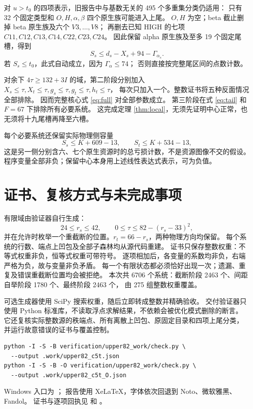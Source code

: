 \documentclass[11pt,a4paper]{article}
\begin{document}
对 $u>t_0$ 的四项表示，旧报告中与基数无关的 495 个多重集分类仍适用：
只有 32 个固定类型和 $O,H,\alpha,\beta$ 四个原生族可能进入上尾。
$O,H$ 为空；beta 截止删掉 beta 原生族及六个 $V3,\ldots,V8$；
再删去已知 HIGH 的七项 $C11,C12,C13,C14,C22,C23,C24$。
因此保留 alpha 原生族及至多 19 个固定尾槽，得到
\begin{equation}
 S_s\le d_s-X_s+94-\Gamma_{\alpha_s}.
 \label{eq:tail}
\end{equation}
若 $S_s\le t_0$，此式自动成立，因为 $\Gamma_\alpha\le74$；
否则直接按完整尾区间的点数计数。

对余下 $4\tau\ge132+3I$ 的域，第二阶段分别加入
$X_s\le\tau,X_t\le\tau,g_s\le\tau,g_t\le\tau,h_t\le\tau$，
每次只加入一个。整数证书将五种反面情况全部排除。
因而完整核心式 \eqref{eq:full} 对全部参数成立。
第三阶段在式 \eqref{eq:tail} 和 $F=67$ 下排除所有必要系统。
这完成定理 \ref{thm:local}，无须先证明中心正常，也无须将十九尾槽再降至六槽。

每个必要系统还保留实际物理侧容量
\[
 S_s\le K+609-13,\qquad S_t\le K+534-13,
\]
这是另一侧分别含六、七个原生资源时的总亏损计数，不是资源图像不交的假设。
程序变量全部非负；保留中心本身用上述线性表达式表示，可为负值。

\section{证书、复核方式与未完成事项}
有限域由验证器自行生成：
\[
 24\le r_s\le42,\qquad0\le\tau\le82-(r_s-33)^2,
\]
并在允许时枚举一个重截断的位置。$r_t=66-r_s$，两种物理方向均保留。
每个系统的行数、端点上凹包及全部子森林均从源代码重建。
证书只保存整数权重：不等式权重非负，恒等式权重可带符号。
逐项相加后，各变量的系数均非负，右端严格为负，故与变量非负矛盾。
每一个有限状态都必须恰好出现一次；遗漏、重复及错误重截断位置均会被拒绝。
本次共 6706 个系统：截断阶段 2463 个、间距自举阶段 1780 个、最终阶段 2463 个，
由 275 组整数权重覆盖。

可选生成器使用 SciPy 搜索权重，随后立即转成整数并精确验收。
交付验证器只使用 Python 标准库，不读取浮点求解结果，不依赖会被优化模式删除的断言。
它还复核实际整数源的秩端点、所有离散上凹包、原固定目录和四项上尾分类，
并运行故意错误的证书与覆盖控制。

\begin{verbatim}
python -I -S -B verification/upper82_work/check.py \
  --output .work/upper82_c5t.json
python -I -S -B -O verification/upper82_work/check.py \
  --output .work/upper82_c5t_O.json
\end{verbatim}
Windows 入口为 ；
报告使用 XeLaTeX，字体依次回退到 Noto、微软雅黑、Fandol。
证书与逐项回执见
 和
。
\end{document}
